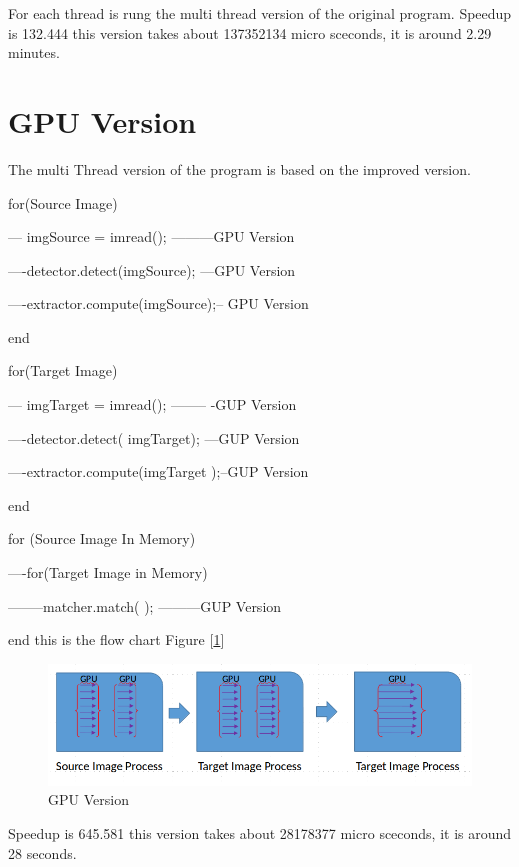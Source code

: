 \documentclass[journal]{IEEEtran}
\begin{document}
For each thread is rung the multi thread version of the original program.
Speedup is 132.444
this version takes about 137352134 micro sceconds, it is around 2.29 minutes. 

\section{GPU Version}

The multi Thread version of the program is based on the improved version. 

for(Source Image)

--- imgSource = imread(); ---------GPU Version

----detector.detect(imgSource); ---GPU Version

----extractor.compute(imgSource);-- GPU Version

end

for(Target Image)

--- imgTarget = imread(); -------- -GUP Version

----detector.detect( imgTarget); ---GUP Version

----extractor.compute(imgTarget );--GUP Version

end
	
for (Source Image In Memory)

----for(Target Image in Memory)

--------matcher.match( ); ---------GUP Version

end
this is the flow chart Figure [\ref{fig:figure14}]
		\begin{figure}[h]
			\centering
			\includegraphics[scale=0.25]{Figure/GPUI.png}
			\caption{ GPU Version }
			\label{fig:figure14}
		\end{figure} 


Speedup is 645.581
this version takes about 28178377 micro sceconds, it is around 28 seconds. 
\end{document}

